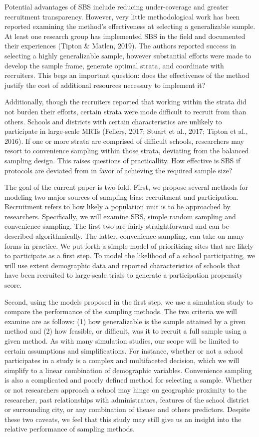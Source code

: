 \documentclass[man,floatsintext]{apa6}
\begin{document}
Potential advantages of SBS include reducing under-coverage and greater recruitment transparency. However, very little methodological work has been reported examining the method's effectiveness at selecting a generalizable sample. At least one research group has implemented SBS in the field and documented their experiences (Tipton \& Matlen, 2019). The authors reported success in selecting a highly generalizable sample, however substantial efforts were made to develop the sample frame, generate optimal strata, and coordinate with recruiters. This begs an important question: does the effectivenes of the method justify the cost of additional resources necessary to implement it?

Additionally, though the recruiters reported that working within the strata did not burden their efforts, certain strata were mode difficult to recruit from than others. Schools and districts with certain characteristics are unlikely to participate in large-scale MRTs (Fellers, 2017; Stuart et al., 2017; Tipton et al., 2016). If one or more strata are comprised of difficult schools, researchers may resort to convenience sampling within those strata, deviating from the balanced sampling design. This raises questions of practicallity. How effective is SBS if protocols are deviated from in favor of achieving the required sample size?

The goal of the current paper is two-fold. First, we propose several methods for modeling two major sources of sampling bias: recruitment and participation. Recruitment refers to how likely a population unit is to be approached by researchers. Specifically, we will examine SBS, simple random sampling and convenience sampling. The first two are fairly straightforward and can be described algorithmically. The latter, convenience sampling, can take on many forms in practice. We put forth a simple model of prioritizing sites that are likely to participate as a first step. To model the likelihood of a school participating, we will use extent demographic data and reported characteristics of schools that have been recruited to large-scale trials to generate a participation propensity score.

Second, using the models proposed in the first step, we use a simulation study to compare the performance of the sampling methods. The two criteria we will examine are as follows: (1) how generalizable is the sample attained by a given method and (2) how feasible, or difficult, was it to recruit a full sample using a given method. As with many simulation studies, our scope will be limited to certain assumptions and simplifications. For instance, whether or not a school participates in a study is a complex and multifaceted decision, which we will simplify to a linear combination of demographic variables. Convenience sampling is also a complicated and poorly defined method for selecting a sample. Whether or not researchers approach a school may hinge on geographic proximity to the researcher, past relationships with administrators, features of the school district or surrounding city, or any combination of thease and others predictors. Despite these two caveats, we feel that this study may still give us an insight into the relative performance of sampling methods.
\end{document}
